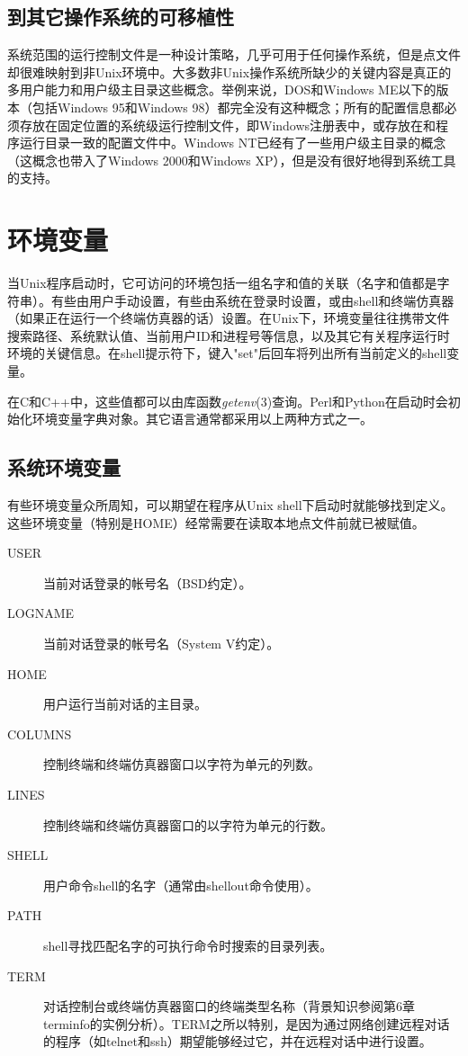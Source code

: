 \documentclass[12pt,oneside]{book}
\begin{document}
\subsection{到其它操作系统的可移植性}
系统范围的运行控制文件是一种设计策略，几乎可用于任何操作系统，但是点文件却很难映射到非Unix环境中。大多数非Unix操作系统所缺少的关键内容是真正的多用户能力和用户级主目录这些概念。举例来说，DOS和Windows ME以下的版本（包括Windows 95和Windows 98）都完全没有这种概念；所有的配置信息都必须存放在固定位置的系统级运行控制文件，即Windows注册表中，或存放在和程序运行目录一致的配置文件中。Windows NT已经有了一些用户级主目录的概念（这概念也带入了Windows 2000和Windows XP），但是没有很好地得到系统工具的支持。


\section{环境变量}
当Unix程序启动时，它可访问的环境包括一组名字和值的关联（名字和值都是字符串）。有些由用户手动设置，有些由系统在登录时设置，或由shell和终端仿真器（如果正在运行一个终端仿真器的话）设置。在Unix下，环境变量往往携带文件搜索路径、系统默认值、当前用户ID和进程号等信息，以及其它有关程序运行时环境的关键信息。在shell提示符下，键入"set"后回车将列出所有当前定义的shell变量。

在C和C++中，这些值都可以由库函数\textit{getenv}(3)查询。Perl和Python在启动时会初始化环境变量字典对象。其它语言通常都采用以上两种方式之一。

\subsection{系统环境变量}
有些环境变量众所周知，可以期望在程序从Unix shell下启动时就能够找到定义。这些环境变量（特别是HOME）经常需要在读取本地点文件前就已被赋值。
\begin{description}
\item[USER] 当前对话登录的帐号名（BSD约定）。
\item[LOGNAME] 当前对话登录的帐号名（System V约定）。
\item[HOME] 用户运行当前对话的主目录。
\item[COLUMNS] 控制终端和终端仿真器窗口以字符为单元的列数。
\item[LINES] 控制终端和终端仿真器窗口的以字符为单元的行数。
\item[SHELL] 用户命令shell的名字（通常由shellout命令使用）。
\item[PATH] shell寻找匹配名字的可执行命令时搜索的目录列表。
\item[TERM] 对话控制台或终端仿真器窗口的终端类型名称（背景知识参阅第6章terminfo的实例分析）。TERM之所以特别，是因为通过网络创建远程对话的程序（如telnet和ssh）期望能够经过它，并在远程对话中进行设置。
\end{description}    
\end{document}
